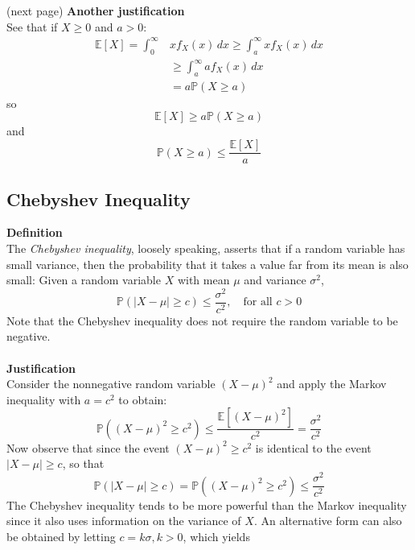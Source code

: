 \documentclass{report}
\begin{document}
(next page)
\newpage
\noindent\textbf{Another justification}\\
See that if $X\geq0$ and $a>0$:
\begin{align*}
\mathbb{E}[X]=\int^\infty_0&xf_X(x)\,dx\geq\int^\infty_axf_X(x)\,dx\\
&\geq\int^\infty_aaf_X(x)\,dx\\
&=a\mathbb{P}(X\geq a)
\end{align*}
so
\begin{equation*}
\mathbb{E}[X]\geq a\mathbb{P}(X\geq a)
\end{equation*}
and
\begin{equation*}
\mathbb{P}(X\geq a)\leq\frac{\mathbb{E}[X]}{a}
\end{equation*}
\newpage

\subsection{Chebyshev Inequality}
\textbf{Definition}\\
The \textit{Chebyshev inequality}, loosely speaking, asserts that if a random variable has small variance, then
the probability that it takes a value far from its mean is also small: Given a random
variable $X$ with mean $\mu$ and variance $\sigma^2$,
\begin{equation*}
\boxed{\mathbb{P}(|X-\mu|\geq c)\leq\frac{\sigma^2}{c^2},\quad\text{for all $c>0$}}
\end{equation*}
Note that the Chebyshev inequality does not require the random variable to be negative.\\
\vspace{1mm}\\
\textbf{Justification}\\
Consider the nonnegative random variable $(X-\mu)^2$ and apply the Markov inequality with $a=c^2$ to obtain:
\begin{equation*}
\mathbb{P}((X-\mu)^2\geq c^2)\leq\frac{\mathbb{E}\left[(X-\mu)^2\right]}{c^2}=\frac{\sigma^2}{c^2}
\end{equation*}
Now observe that since the event $(X-\mu)^2\geq c^2$ is identical to the event $|X-\mu|\geq c$, so that
\begin{equation*}
\mathbb{P}(|X-\mu|\geq c)=\mathbb{P}((X-\mu)^2\geq c^2)\leq\frac{\sigma^2}{c^2}
\end{equation*}
The Chebyshev inequality tends to be more powerful than the Markov inequality since it also uses information on
the variance of $X$. An alternative form can also be obtained by letting $c=k\sigma, k>0$, which yields
\end{document}
